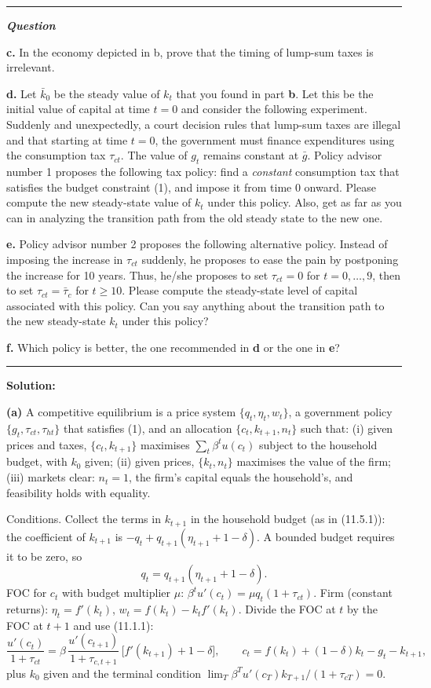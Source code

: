 \documentclass[12pt, letterpaper]{article}
\newenvironment{longquestion}{\par\small\noindent\textcolor{gray!60}{\rule{\linewidth}{0.4pt}}\par\nobreak
  \noindent\textcolor{gray!60!black}{\bfseries\textit{Question}}\par\nobreak}{\par\noindent
  \textcolor{gray!60}{\rule{\linewidth}{0.4pt}}\par}
\begin{document}
\begin{tcolorbox}[oddbox,title={Exercise 11.1 \quad Tax reform: I}]
\begin{longquestion}
\textbf{c.} In the economy depicted in b, prove that the timing of lump-sum taxes is irrelevant.

\textbf{d.} Let $\bar k_0$ be the steady value of $k_t$ that you found in part \textbf{b}. Let this be the initial value
of capital at time $t=0$ and consider the following experiment. Suddenly and unexpectedly, a court decision rules that
lump-sum taxes are illegal and that starting at time $t=0$, the government must finance expenditures using the
consumption tax $\tau_{ct}$. The value of $g_t$ remains constant at $\bar g$. Policy advisor number 1 proposes the
following tax policy: find a \emph{constant} consumption tax that satisfies the budget constraint (1), and impose it
from time 0 onward. Please compute the new steady-state value of $k_t$ under this policy. Also, get as far as you can in
analyzing the transition path from the old steady state to the new one.

\textbf{e.} Policy advisor number 2 proposes the following alternative policy. Instead of imposing the increase in
$\tau_{ct}$ suddenly, he proposes to ease the pain by postponing the increase for 10 years. Thus, he/she proposes to set
$\tau_{ct}=0$ for $t=0,\dots,9$, then to set $\tau_{ct}=\bar\tau_c$ for $t\ge10$. Please compute the steady-state level
of capital associated with this policy. Can you say anything about the transition path to the new steady-state $k_t$
under this policy?

\textbf{f.} Which policy is better, the one recommended in \textbf{d} or the one in \textbf{e}?
\end{longquestion}

\textbf{Solution:}

\textbf{(a)} A competitive equilibrium is a price system $\{q_t,\eta_t,w_t\}$, a government policy
$\{g_t,\tau_{ct},\tau_{ht}\}$ that satisfies (1), and an allocation $\{c_t,k_{t+1},n_t\}$ such that: (i) given prices and
taxes, $\{c_t,k_{t+1}\}$ maximises $\sum_t\beta^tu(c_t)$ subject to the household budget, with $k_0$ given; (ii) given
prices, $\{k_t,n_t\}$ maximises the value of the firm; (iii) markets clear: $n_t=1$, the firm's capital equals the
household's, and feasibility holds with equality.

Conditions. Collect the terms in $k_{t+1}$ in the household budget (as in (11.5.1)): the coefficient of $k_{t+1}$ is
$-q_t+q_{t+1}(\eta_{t+1}+1-\delta)$. A bounded budget requires it to be zero, so
\[
q_t=q_{t+1}(\eta_{t+1}+1-\delta).\tag{11.1.1}
\]
FOC for $c_t$ with budget multiplier $\mu$: $\beta^tu'(c_t)=\mu q_t(1+\tau_{ct})$. Firm (constant returns):
$\eta_t=f'(k_t)$, $w_t=f(k_t)-k_tf'(k_t)$. Divide the FOC at $t$ by the FOC at $t+1$ and use (11.1.1):
\[
\frac{u'(c_t)}{1+\tau_{ct}}=\beta\,\frac{u'(c_{t+1})}{1+\tau_{c,t+1}}\,\big[f'(k_{t+1})+1-\delta\big],\qquad
c_t=f(k_t)+(1-\delta)k_t-g_t-k_{t+1},\tag{11.1.2}
\]
plus $k_0$ given and the terminal condition $\lim_T\beta^Tu'(c_T)k_{T+1}/(1+\tau_{cT})=0$.


\end{tcolorbox}
\end{document}
